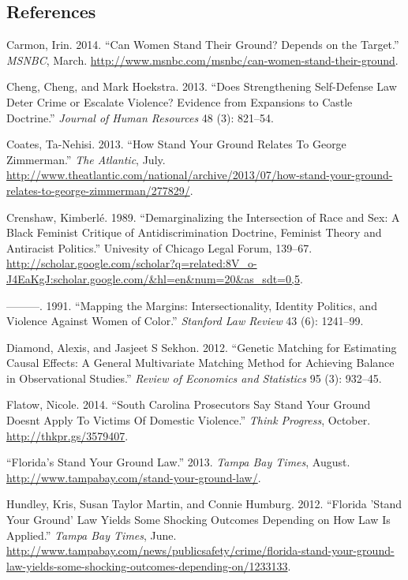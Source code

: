 \documentclass[12pt,article]{article}
\begin{document}
\subsection*{References}\label{references}

Carmon, Irin. 2014. ``Can Women Stand Their Ground? Depends on the
Target.'' \emph{MSNBC}, March.
\url{http://www.msnbc.com/msnbc/can-women-stand-their-ground}.

Cheng, Cheng, and Mark Hoekstra. 2013. ``Does Strengthening Self-Defense
Law Deter Crime or Escalate Violence? Evidence from Expansions to Castle
Doctrine.'' \emph{Journal of Human Resources} 48 (3): 821--54.

Coates, Ta-Nehisi. 2013. ``How Stand Your Ground Relates To George
Zimmerman.'' \emph{The Atlantic}, July.
\url{http://www.theatlantic.com/national/archive/2013/07/how-stand-your-ground-relates-to-george-zimmerman/277829/}.

Crenshaw, Kimberl{é}. 1989. ``Demarginalizing the Intersection of Race
and Sex: A Black Feminist Critique of Antidiscrimination Doctrine,
Feminist Theory and Antiracist Politics.'' Univesity of Chicago Legal
Forum, 139--67.
\url{http://scholar.google.com/scholar?q=related:8V_o-J4EaKgJ:scholar.google.com/\&hl=en\&num=20\&as_sdt=0,5}.

---------. 1991. ``Mapping the Margins: Intersectionality, Identity
Politics, and Violence Against Women of Color.'' \emph{Stanford Law
Review} 43 (6): 1241--99.

Diamond, Alexis, and Jasjeet S Sekhon. 2012. ``Genetic Matching for
Estimating Causal Effects: A General Multivariate Matching Method for
Achieving Balance in Observational Studies.'' \emph{Review of Economics
and Statistics} 95 (3): 932--45.

Flatow, Nicole. 2014. ``South Carolina Prosecutors Say Stand Your Ground
Doesnt Apply To Victims Of Domestic Violence.'' \emph{Think Progress},
October. \url{http://thkpr.gs/3579407}.

``Florida's Stand Your Ground Law.'' 2013. \emph{Tampa Bay Times},
August. \url{http://www.tampabay.com/stand-your-ground-law/}.

Hundley, Kris, Susan Taylor Martin, and Connie Humburg. 2012. ``Florida
'Stand Your Ground' Law Yields Some Shocking Outcomes Depending on How
Law Is Applied.'' \emph{Tampa Bay Times}, June.
\url{http://www.tampabay.com/news/publicsafety/crime/florida-stand-your-ground-law-yields-some-shocking-outcomes-depending-on/1233133}.
\end{document}

